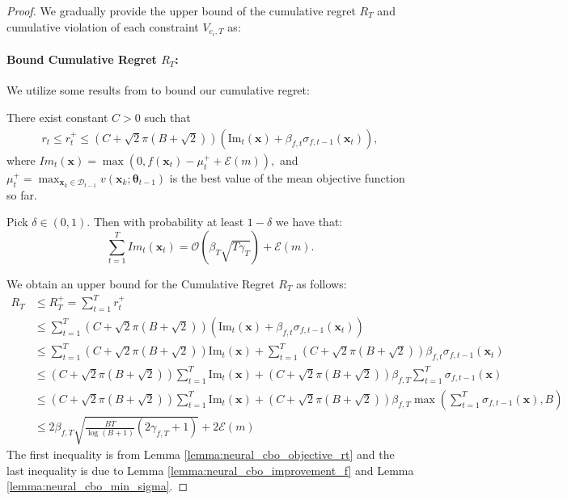 \begin{proof}

We gradually provide the upper bound of the cumulative regret $R_T$ and cumulative violation of each constraint $V_{c_i,T}$ as: 
\paragraph{Bound Cumulative Regret $R_{T}$:}
We utilize some results from \citep{tran2022regret} to bound our cumulative regret:
\begin{lemma}
    \label{lemma:neural_cbo_objective_rt}
    There exist constant $C > 0$ such that
    \begin{align*}
        r_t \le r_t^+ \le \left(C + \sqrt{2}\pi(B + \sqrt{2}) \right)\left(\text{Im}_t (\mathbf{x})+ \beta_{f,t} \sigma_{f,t-1}(\mathbf{x}_t) \right),
    \end{align*}
    where $Im_t (\mathbf{x}) = \max(0, f(\mathbf{x}_t) - \mu_t^+ + \mathcal{E}(m)), $ and $\mu^+_t = \max_{\mathbf{x}_k \in \mathcal{D}_{t-1}} v(\mathbf{x}_k; \boldsymbol{\theta}_{t-1})$ is the best value of the mean objective function so far. 
\end{lemma}

\begin{lemma}
\label{lemma:neural_cbo_improvement_f}
    Pick $\delta \in (0, 1)$. Then with probability at least $1 - \delta$ we have that:
    \[ \sum_{t=1}^T {Im}_t (\mathbf{x}_t) = \mathcal{O}(\beta_T \sqrt{T\gamma_T} ) + \mathcal{E}(m). \]
\end{lemma}

We obtain an upper bound for the Cumulative Regret $R_T$ as follows:
\begin{align*}
    R_T & \le R_T^+ = \sum_{t=1}^T r_t^+
    \\
    & \le \sum_{t=1}^T \left(C + \sqrt{2}\pi(B + \sqrt{2}) \right)\left(\text{Im}_t (\mathbf{x})+ \beta_{f,t} \sigma_{f,t-1}(\mathbf{x}_t) \right)
    \\
    & \le \sum_{t=1}^T \left(C + \sqrt{2}\pi(B + \sqrt{2}) \right) \text{Im}_t (\mathbf{x}) +  \sum_{t=1}^T  \left(C + \sqrt{2}\pi(B + \sqrt{2}) \right) \beta_{f,t} \sigma_{f,t-1}(\mathbf{x}_t) 
    \\
    & \le \left(C + \sqrt{2}\pi(B + \sqrt{2}) \right) \sum_{t=1}^T \text{Im}_t (\mathbf{x}) +  \left(C + \sqrt{2}\pi(B + \sqrt{2}) \right) \beta_{f,T} \sum_{t=1}^T \sigma_{f,t-1}(\mathbf{x})
    \\
    & \le \left(C + \sqrt{2}\pi(B + \sqrt{2}) \right) \sum_{t=1}^T \text{Im}_t (\mathbf{x}) +  \left(C + \sqrt{2}\pi(B + \sqrt{2}) \right) \beta_{f,T} \max \left(\sum_{t=1}^T \sigma_{f,t-1}(\mathbf{x}), B \right) 
    \\
    & \le 2 \beta_{f,T} \sqrt{\frac{B T}{\log(B+1)} (2\gamma_{f,T}+1)} + 2 \mathcal{E}(m)
\end{align*}
The first inequality is from Lemma \ref{lemma:neural_cbo_objective_rt} and the last inequality is due to Lemma \ref{lemma:neural_cbo_improvement_f} and Lemma \ref{lemma:neural_cbo_min_sigma}. 

\end{proof}
